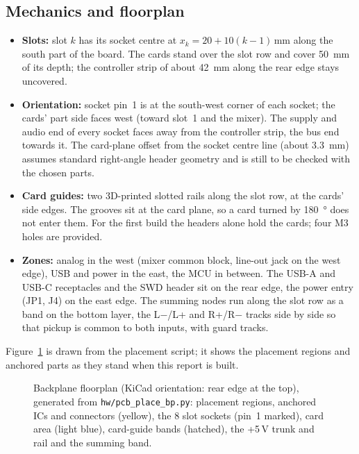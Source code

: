 \documentclass[11pt,a4paper]{article}
\newcommand{\file}[1]{\texttt{#1}}
\begin{document}
\subsection{Mechanics and floorplan}
\begin{itemize}
  \item \textbf{Slots:} slot $k$ has its socket centre at $x_k = 20 + 10(k-1)$\,mm along the south part of the board.
    The cards stand over the slot row and cover \SI{50}{mm} of its depth; the controller strip of about \SI{42}{mm}
    along the rear edge stays uncovered.
  \item \textbf{Orientation:} socket pin~1 is at the south-west corner of each socket; the cards' part side faces west
    (toward slot~1 and the mixer). The supply and audio end of every socket faces away from the controller strip, the
    bus end towards it. The card-plane offset from the socket centre line (about \SI{3.3}{mm}) assumes standard
    right-angle header geometry and is still to be checked with the chosen parts.
  \item \textbf{Card guides:} two 3D-printed slotted rails along the slot row, at the cards' side edges. The grooves
    sit at the card plane, so a card turned by \SI{180}{\degree} does not enter them. For the first build the headers
    alone hold the cards; four M3 holes are provided.
  \item \textbf{Zones:} analog in the west (mixer common block, line-out jack on the west edge), USB and power in the
    east, the MCU in between. The USB-A and USB-C receptacles and the SWD header sit on the rear edge, the power entry
    (JP1, J4) on the east edge. The summing nodes run along the slot row as a band on the bottom layer, the L$-$/L+ and R+/R$-$ tracks
    side by side so that pickup is common to both inputs, with guard tracks.
\end{itemize}
Figure~\ref{fig:floorbp} is drawn from the placement script; it shows the placement regions and anchored parts as
they stand when this report is built.

\begin{figure}[htbp]
\centering

\caption{Backplane floorplan (KiCad orientation: rear edge at the top), generated from \file{hw/pcb\_place\_bp.py}:
placement regions, anchored ICs and connectors (yellow), the 8 slot sockets (pin~1 marked), card area (light blue),
card-guide bands (hatched), the +5\,V trunk and rail and the summing band.}
\label{fig:floorbp}
\end{figure}
\end{document}
